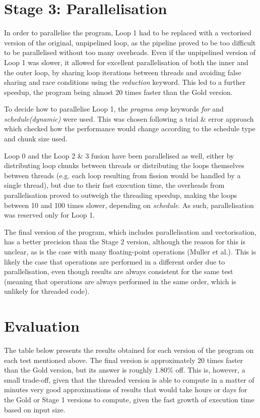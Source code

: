 \documentclass[10pt,a4paper]{article}
\begin{document}
\section*{Stage 3: Parallelisation}

In order to parallelise the program, Loop 1 had to be replaced with a vectorised version of the original, unpipelined loop, as the pipeline proved to be too difficult to be parallelised without too many overheads.
Even if the unpipelined version of Loop 1 was slower, it allowed for excellent parallelisation of both the inner and the outer loop, by sharing loop iterations between threads and avoiding false sharing and race conditions using the \textit{reduction} keyword. This led to a further speedup, the program being almost 20 times faster than the Gold version.

To decide how to parallelise Loop 1, the \textit{pragma omp} keywords \textit{for} and \textit{schedule(dynamic)} were used. This was chosen following a trial \& error approach which checked how the performance would change according to the schedule type and chunk size used.

Loop 0 and the Loop 2 \& 3 fusion have been parallelised as well, either by distributing loop chunks between threads or distributing the loops themselves between threads (e.g. each loop resulting from fission would be handled by a single thread), but due to their fast execution time, the overheads from parallelisation proved to outweigh the threading speedup, making the loops between 10 and 100 times slower, depending on \textit{schedule}. As such, parallelisation was reserved only for Loop 1.

The final version of the program, which includes parallelisation and vectorisation, has a better precision than the Stage 2 version, although the reason for this is unclear, as is the case with many floating-point operations (Muller et al.). This is likely the case that operations are performed in a different order due to parallelisation, even though results are always consistent for the same test (meaning that operations are always performed in the same order, which is unlikely for threaded code).

\section*{Evaluation}

The table below presents the results obtained for each version of the program on each test mentioned above. The final version is approximately 20 times faster than the Gold version, but its answer is roughly 1.80\% off. This is, however, a small trade-off, given that the threaded version is able to compute in a matter of minutes very good approximations of results that would take hours or days for the Gold or Stage 1 versions to compute, given the fast growth of execution time based on input size.\\
\end{document}
